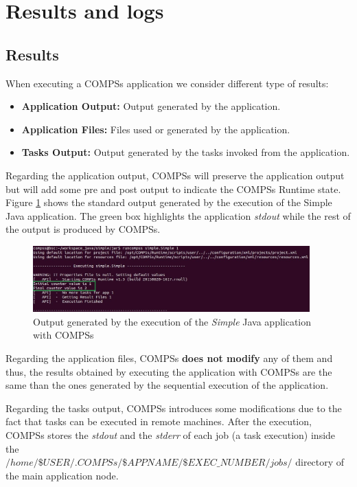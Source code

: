  \section{Results and logs}
\label{sec:Results_and_Logs}

\subsection{Results}
When executing a COMPSs application we consider different type of results:
\begin{itemize}
 \item \textbf{Application Output:} Output generated by the application.
 \item \textbf{Application Files:}  Files used or generated by the application.
 \item \textbf{Tasks Output:} Output generated by the tasks invoked from the application.
\end{itemize}

Regarding the application output, COMPSs will preserve the application output but will add some pre and post output to indicate
the COMPSs Runtime state. Figure \ref{fig:compss_out} shows the standard output generated by the execution of the 
Simple Java application. The green box highlights the application \textit{stdout} while the rest of the output is produced by COMPSs.  
\begin{figure}[h!]
  \centering
    \includegraphics[width=0.95\textwidth]{./Sections/3_Results_and_Logs/Figures/simple_java_stdout.jpeg}
    \caption{Output generated by the execution of the \textit{Simple} Java application with COMPSs}
    \label{fig:compss_out}
\end{figure}

Regarding the application files, COMPSs \textbf{does not modify} any of them and thus, the
results obtained by executing the application with COMPSs are the same than the ones generated by the sequential execution
of the application.

Regarding the tasks output, COMPSs introduces some modifications due to the fact that tasks can be executed in remote
machines. After the execution, COMPSs stores the \textit{stdout} and the \textit{stderr} of each job (a task execution) inside the\\ \textbf{$/home/\$USER/.COMPSs/\$APPNAME/\$EXEC\_NUMBER/jobs/$} directory of the main application node.

